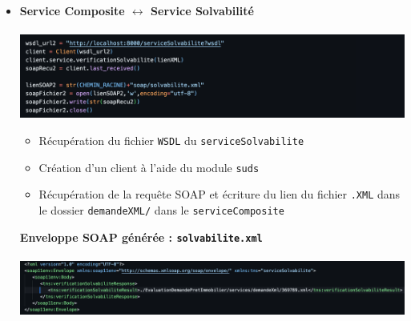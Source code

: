 \documentclass{article}
\begin{document}
\begin{itemize}
\newpage
          \item \textbf{Service Composite $\leftrightarrow$ Service Solvabilité} \\ \\
          \includegraphics[width=\textwidth]{Images/7.3/wsdlSolvabilite.png}\\
          \begin{itemize}
              \item Récupération du fichier \texttt{WSDL} du \texttt{serviceSolvabilite}
              \item Création d'un client à l'aide du module \texttt{suds}
              \item Récupération de la requête SOAP et écriture du lien du fichier \texttt{.XML} dans le dossier \texttt{demandeXML/} dans le \texttt{serviceComposite}
          \end{itemize}
          \textbf{Enveloppe SOAP générée : \texttt{solvabilite.xml}}\\ \\
          \includegraphics[width=\textwidth]{Images/7.3/SOAPSolvabilite.png}


\end{itemize}
\end{document}
